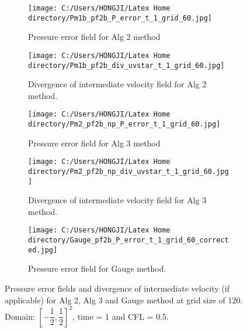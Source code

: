 \begin{figure}[H]
	\centering
	\begin{subfigure}[t]{2.2in}
		\centering
		\texttt{[image: C:/Users/HONGJI/Latex Home directory/Pm1b\_pf2b\_P\_error\_t\_1\_grid\_60.jpg]}
		\caption{Pressure error field for Alg 2 method}\label{fig:6.19a}		
	\end{subfigure}
	\quad
	\begin{subfigure}[t]{2.6in}
		\centering
		\texttt{[image: C:/Users/HONGJI/Latex Home directory/Pm1b\_pf2b\_div\_uvstar\_t\_1\_grid\_60.jpg]}
		\caption{Divergence of intermediate velocity field for Alg 2 method. }\label{fig:6.19b}
	\end{subfigure}
	\quad
	\centering
	\begin{subfigure}[t]{2.2in}
		\centering
		\texttt{[image: C:/Users/HONGJI/Latex Home directory/Pm2\_pf2b\_np\_P\_error\_t\_1\_grid\_60.jpg]}
		\caption{Pressure error field for Alg 3 method}\label{fig:6.19c}		
	\end{subfigure}
	\quad
	\begin{subfigure}[t]{2.6in}
		\centering
		\texttt{[image: C:/Users/HONGJI/Latex Home directory/Pm2\_pf2b\_np\_div\_uvstar\_t\_1\_grid\_60.jpg]}
		\caption{Divergence of intermediate velocity field for Alg 3 method.}\label{fig:6.19d}
	\end{subfigure}
	\quad
	\begin{subfigure}[t]{2.5in}
		\centering
		\texttt{[image: C:/Users/HONGJI/Latex Home directory/Gauge\_pf2b\_P\_error\_t\_1\_grid\_60\_corrected.jpg]}
		\caption{Pressure error field for Gauge method. }\label{fig:6.19d}
	\end{subfigure}
	\caption{Pressure error fields and divergence of intermediate velocity (if applicable) for Alg 2, Alg 3 and Gauge method at grid size of 120. Domain: $[-\dfrac{1}{2},\dfrac{1}{2}]^2$, time = 1 and CFL = 0.5. }\label{fig:6.16}
\end{figure}

